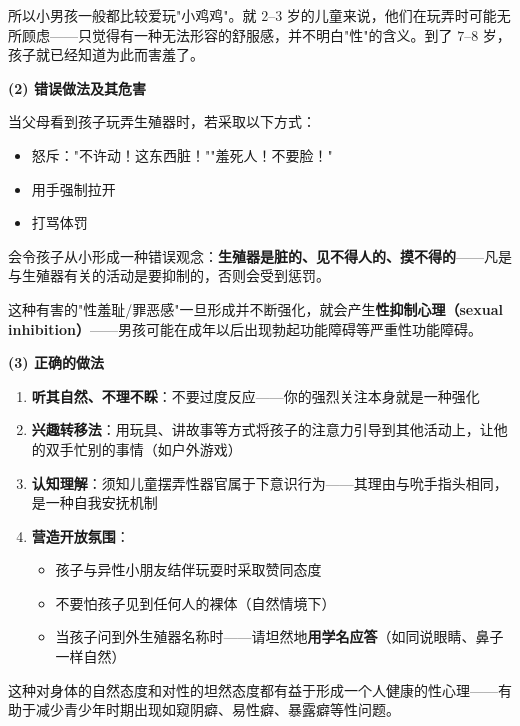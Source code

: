 所以小男孩一般都比较爱玩"小鸡鸡"。就 $2$--$3$ 岁的儿童来说，他们在玩弄时可能无所顾虑——只觉得有一种无法形容的舒服感，并不明白"性"的含义。到了 $7$--$8$ 岁，孩子就已经知道为此而害羞了。

\vspace{0.3em}
\noindent\textbf{(2) 错误做法及其危害}

当父母看到孩子玩弄生殖器时，若采取以下方式：
\begin{itemize}
	\item 怒斥："不许动！这东西脏！""羞死人！不要脸！"
	\item 用手强制拉开
	\item 打骂体罚
\end{itemize}

会令孩子从小形成一种错误观念：\textbf{生殖器是脏的、见不得人的、摸不得的}——凡是与生殖器有关的活动是要抑制的，否则会受到惩罚。

这种有害的"性羞耻/罪恶感"一旦形成并不断强化，就会产生\textbf{性抑制心理（sexual inhibition）}——男孩可能在成年以后出现勃起功能障碍等严重性功能障碍。

\vspace{0.3em}
\noindent\textbf{(3) 正确的做法}

\begin{enumerate}
	\item \textbf{听其自然、不理不睬}：不要过度反应——你的强烈关注本身就是一种强化

	\vspace{0.3em}
	\item \textbf{兴趣转移法}：用玩具、讲故事等方式将孩子的注意力引导到其他活动上，让他的双手忙别的事情（如户外游戏）

	\vspace{0.3em}
	\item \textbf{认知理解}：须知儿童摆弄性器官属于下意识行为——其理由与吮手指头相同，是一种自我安抚机制

	\vspace{0.3em}
	\item \textbf{营造开放氛围}：
	\begin{itemize}
		\item 孩子与异性小朋友结伴玩耍时采取赞同态度
		\item 不要怕孩子见到任何人的裸体（自然情境下）
		\item 当孩子问到外生殖器名称时——请坦然地\textbf{用学名应答}（如同说眼睛、鼻子一样自然）
	\end{itemize}
\end{enumerate}

这种对身体的自然态度和对性的坦然态度都有益于形成一个人健康的性心理——有助于减少青少年时期出现如窥阴癖、易性癖、暴露癖等性问题。

